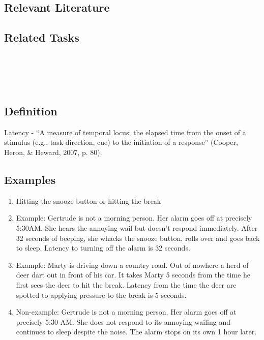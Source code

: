 \subsection{Relevant Literature}
\begin{refsection}
\nocite{cooper2007applied,deleon1999examination}
\printbibliography[heading=none]
\end{refsection}%


\subsection{Related Tasks}
\fourhOne{}\\
\fouriOne{}\\
\fourFKFourtySeven{}\\

%
%
%
%
%
%
%
%
%
\section{\fouraFour{}}
\subsection{Definition}  
Latency - ``A measure of temporal locus; the elapsed time from the onset of a stimulus (e.g., task direction, cue) to the initiation of a response'' (Cooper, Heron, \& Heward, 2007, p. 80).  

\subsection{Examples}
\begin{enumerate}
\item Hitting the snooze button or hitting the break
\item Example: Gertrude is not a morning person.  Her alarm goes off at precisely 5:30AM.  She hears the annoying wail but doesn't respond immediately.  After 32 seconds of beeping, she whacks the snooze button, rolls over and goes back to sleep.  Latency to turning off the alarm is 32 seconds.
\item Example:  Marty is driving down a country road.  Out of nowhere a herd of deer dart out in front of his car.  It takes Marty 5 seconds from the time he first sees the deer to hit the break.  Latency from the time the deer are spotted to applying pressure to the break is 5 seconds.    
\item Non-example: Gertrude is not a morning person.  Her alarm goes off at precisely 5:30 AM.  She does not respond to its annoying wailing and continues to sleep despite the noise.  The alarm stops on its own 1 hour later.
\end{enumerate}
%
